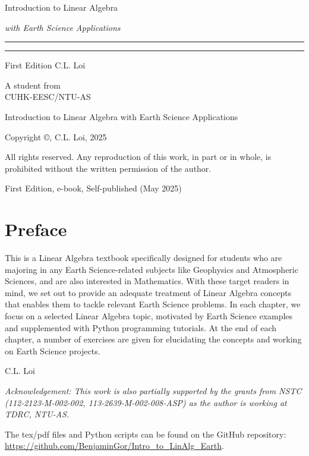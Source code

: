 \begin{titlepage}
    {\Huge\raggedright Introduction to Linear Algebra \par}
    {\Large\raggedright \textit{with Earth Science Applications} \hfill\textcolor{Mahogany}{\rule{3mm}{3mm}} \par}
    \vspace{3mm}\hrule\par
    {\Large\raggedleft First Edition \hfill C.L. Loi \par}
    \vfill
    {\Large\raggedleft A student from\\
    CUHK-EESC/NTU-AS \par}
\end{titlepage}

\begin{titlepage}
\begin{center}
Introduction to Linear Algebra with Earth Science Applications

Copyright ©, C.L. Loi, 2025

All rights reserved. Any reproduction of this work, in part or in whole, is prohibited without the written permission of the author.
\end{center}
\vfill
First Edition, e-book, Self-published (May 2025)
\end{titlepage}


\chapter*{Preface}
This is a Linear Algebra textbook specifically designed for students who are majoring in any Earth Science-related subjects like Geophysics and Atmospheric Sciences, and are also interested in Mathematics. With these target readers in mind, we set out to provide an adequate treatment of Linear Algebra concepts that enables them to tackle relevant Earth Science problems. In each chapter, we focus on a selected Linear Algebra topic, motivated by Earth Science examples and supplemented with Python programming tutorials. At the end of each chapter, a number of exercises are given for elucidating the concepts and working on Earth Science projects. \par
{\raggedleft C.L. Loi \par}
\textit{Acknowledgement: This work is also partially supported by the grants from NSTC (112-2123-M-002-002, 113-2639-M-002-008-ASP) as the author is working at TDRC, NTU-AS.}\par
The tex/pdf files and Python scripts can be found on the GitHub repository:\\ \href{https://github.com/BenjaminGor/Intro_to_LinAlg_Earth}{https://github.com/BenjaminGor/Intro\_to\_LinAlg\_Earth}.

